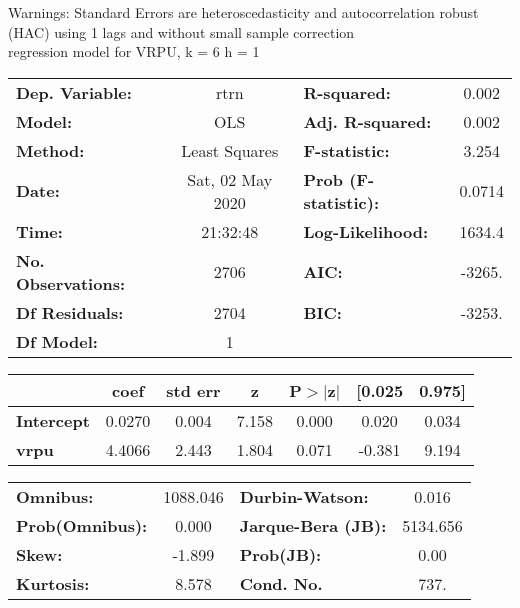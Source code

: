 Warnings: \newline
 [1] Standard Errors are heteroscedasticity and autocorrelation robust (HAC) using 1 lags and without small sample correction\\ 

regression model for VRPU, k = 6 h = 1\begin{center}
\begin{tabular}{lclc}
\toprule
\textbf{Dep. Variable:}    &       rtrn       & \textbf{  R-squared:         } &     0.002   \\
\textbf{Model:}            &       OLS        & \textbf{  Adj. R-squared:    } &     0.002   \\
\textbf{Method:}           &  Least Squares   & \textbf{  F-statistic:       } &     3.254   \\
\textbf{Date:}             & Sat, 02 May 2020 & \textbf{  Prob (F-statistic):} &   0.0714    \\
\textbf{Time:}             &     21:32:48     & \textbf{  Log-Likelihood:    } &    1634.4   \\
\textbf{No. Observations:} &        2706      & \textbf{  AIC:               } &    -3265.   \\
\textbf{Df Residuals:}     &        2704      & \textbf{  BIC:               } &    -3253.   \\
\textbf{Df Model:}         &           1      & \textbf{                     } &             \\
\bottomrule
\end{tabular}
\begin{tabular}{lcccccc}
                   & \textbf{coef} & \textbf{std err} & \textbf{z} & \textbf{P$> |$z$|$} & \textbf{[0.025} & \textbf{0.975]}  \\
\midrule
\textbf{Intercept} &       0.0270  &        0.004     &     7.158  &         0.000        &        0.020    &        0.034     \\
\textbf{vrpu}      &       4.4066  &        2.443     &     1.804  &         0.071        &       -0.381    &        9.194     \\
\bottomrule
\end{tabular}
\begin{tabular}{lclc}
\textbf{Omnibus:}       & 1088.046 & \textbf{  Durbin-Watson:     } &    0.016  \\
\textbf{Prob(Omnibus):} &   0.000  & \textbf{  Jarque-Bera (JB):  } & 5134.656  \\
\textbf{Skew:}          &  -1.899  & \textbf{  Prob(JB):          } &     0.00  \\
\textbf{Kurtosis:}      &   8.578  & \textbf{  Cond. No.          } &     737.  \\
\bottomrule
\end{tabular}
\end{center}

